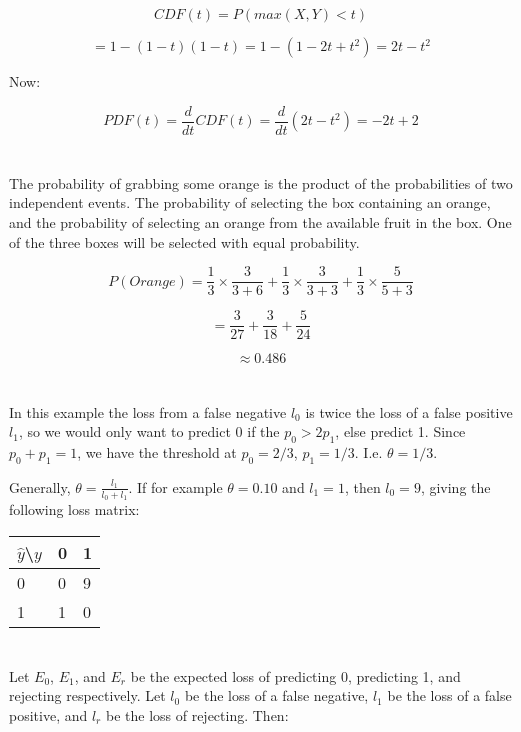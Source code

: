 \documentclass{article}
\begin{document}
\[
CDF(t) = P(max(X,Y) < t) 
\]

\[
= 1-(1-t)(1-t) = 1-(1-2t+t^2) = 2t-t^2
\]

Now:

\[
PDF(t) = \frac{d}{dt}CDF(t) = \frac{d}{dt}(2t-t^2) = -2t+2
\]

\section{}
The probability of grabbing some orange is the product of the
probabilities of two independent events. The probability of selecting the box
containing an orange, and the probability of selecting an orange from the
available fruit in the box. One of the three boxes will be selected with equal
probability.

\[
P(Orange) = \frac{1}{3} \times \frac{3}{3+6}+\frac{1}{3} \times \frac{3}{3+3}+ 
\frac{1}{3} \times \frac{5}{5+3} 
\]

\[
= \frac{3}{27} + \frac{3}{18} + \frac{5}{24}
\]

\[
\approx 0.486
\]

\section{}
In this example the loss from a false negative $l_0$ is twice the loss of a
false positive $l_1$, so we would only want to predict 0 if the $p_0 > 2p_1$,
else predict 1. Since $p_0+p_1=1$, we have the threshold at $p_0 = 2/3$,
$p_1 = 1/3$. I.e. $\theta = 1/3$.

\vspace{1em}

Generally, $\theta = \frac{l_1}{l_0+l_1}$. If for example
$\theta = 0.10$ and $l_1 = 1$, then $l_0 = 9$, giving the following loss
matrix:

\vspace{6pt}

\begin{tabular}{|l|l|l|}
\hline
$\hat{y}$\textbackslash$y$ & 0 & 1\\
\hline
0 & 0 & 9\\
\hline
1 & 1 & 0\\
\hline
\end{tabular}

\section{}
Let $E_0$, $E_1$, and $E_r$ be the expected loss of predicting 0, predicting 1,
and rejecting respectively. Let $l_0$ be the loss of a false negative, $l_1$ be
the loss of a false positive, and $l_r$ be the loss of rejecting. Then:
\end{document}

